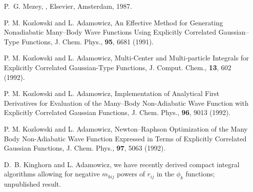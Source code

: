 \begin{thebibliography}{999}
P.~G. Mezey,
,
\newblock Elsevier, Amsterdam, 1987.



P. M. Kozlowski and L. Adamowicz, 
An Effective Method for Generating Nonadiabatic
Many--Body Wave Functions Using Explicitly Correlated
Gaussian--Type Functions,
J. Chem. Phys., {\bf 95}, 6681 (1991).

P. M. Kozlowski and L. Adamowicz, 
Multi-Center and Multi-particle Integrals for
Explicitly Correlated Gaussian-Type Functions,
J. Comput. Chem., {\bf 13}, 602 (1992).


P. M. Kozlowski and L. Adamowicz, 
Implementation of Analytical First Derivatives for
Evaluation of the Many--Body Non-Adiabatic Wave Function
with Explicitly Correlated Gaussian Functions,
J. Chem. Phys., {\bf 96}, 9013 (1992).

P. M. Kozlowski and L. Adamowicz, 
Newton--Raphson Optimization of the Many Body
Non-Adiabatic Wave Function Expressed in Terms of Explicitly
Correlated Gaussian Functions,
J. Chem. Phys., {\bf 97}, 5063 (1992).


%
%
%
%
%
%
%
%
%
%
%
%
%
%
%

D.~B. Kinghorn and L. Adamowicz, we have recently derived
compact integral algorithms allowing for negative $m_{kij}$ powers
of $r_{ij}$ in the $\phi_k$ functions; unpublished result.



\end{thebibliography}
